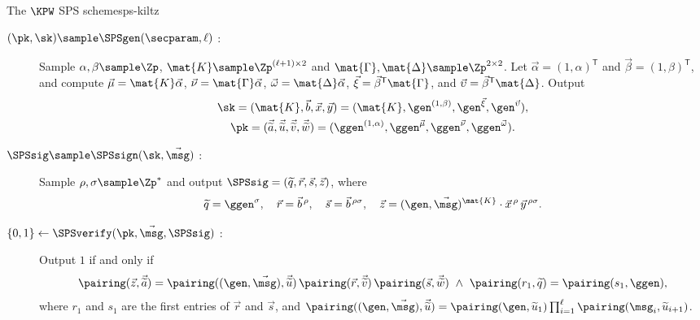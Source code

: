 \begin{primitivebox}{The $\KPW$ SPS scheme}{sps-kiltz}

  \begin{description}

    \item[$(\pk, \sk) \sample \SPSgen(\secparam, \ell)$ :] Sample $\alpha, \beta
\sample \Zp$, $\mat{K} \sample \Zp^{(\ell+1)\times 2}$ and $\mat{\Gamma},
\mat{\Delta} \sample \Zp^{2\times 2}$. Let $\vec{\alpha} = (1,
\alpha)^{\mathsf{T}}$ and $\vec{\beta} = (1, \beta)^{\mathsf{T}}$, and compute
$\vec{\mu} = \mat{K}\vec{\alpha}$, $\vec{\nu} = \mat{\Gamma}\vec{\alpha}$,
$\vec{\omega} = \mat{\Delta}\vec{\alpha}$, $\vec{\xi} =
\vec{\beta}^{\mathsf{T}}\mat{\Gamma}$, and $\vec{\upsilon} =
\vec{\beta}^{\mathsf{T}}\mat{\Delta}$. Output
      \begin{gather*}
	\sk = (\mat{K}, \vec{b}, \vec{x}, \vec{y}) = (\mat{K}, \gen^{(1,
\beta)}, \gen^{\vec{\xi}}, \gen^{\vec{\upsilon}}), \\
	\pk = (\vec{\widetilde{a}}, \vec{\widetilde{u}}, \vec{\widetilde{v}},
\vec{\widetilde{w}}) = (\ggen^{(1, \alpha)}, \ggen^{\vec{\mu}},
\ggen^{\vec{\nu}}, \ggen^{\vec{\omega}}).
      \end{gather*}

    \item[$\SPSsig \sample \SPSsign(\sk, \vec{\msg})$ :] Sample $\rho, \sigma
\sample \Zp^*$ and output $\SPSsig = (\widetilde{q}, \vec{r}, \vec{s},
\vec{z})$, where
      \begin{equation*}
	\widetilde{q} = \ggen^{\sigma}, \quad \vec{r} = \vec{b}^{\,\rho},
\quad \vec{s} = \vec{b}^{\,\rho\sigma}, \quad \vec{z} = (\gen,
\vec{\msg})^{\mat{K}} \cdot \vec{x}^{\,\rho}\, \vec{y}^{\,\rho\sigma}.
      \end{equation*}

    \item[$\{0,1\} \leftarrow \SPSverify(\pk, \vec{\msg}, \SPSsig)$ :] Output
$1$ if and only if
      \begin{equation*}
	\pairing(\vec{z}, \vec{\widetilde{a}}) = \pairing((\gen,
\vec{\msg}), \vec{\widetilde{u}})\, \pairing(\vec{r},\vec{\widetilde{v}})\,
\pairing(\vec{s}, \vec{\widetilde{w}}) \ \wedge \ \pairing(r_1, \widetilde{q})
= \pairing(s_1, \ggen),
      \end{equation*}
      where $r_1$ and $s_1$ are the first entries of $\vec{r}$ and $\vec{s}$, and
$\pairing((\gen, \vec{\msg}), \vec{\widetilde{u}}) = \pairing(\gen,
\widetilde{u}_1) \prod_{i=1}^{\ell} \pairing(\msg_i, \widetilde{u}_{i+1})$.

  \end{description}

\end{primitivebox}

